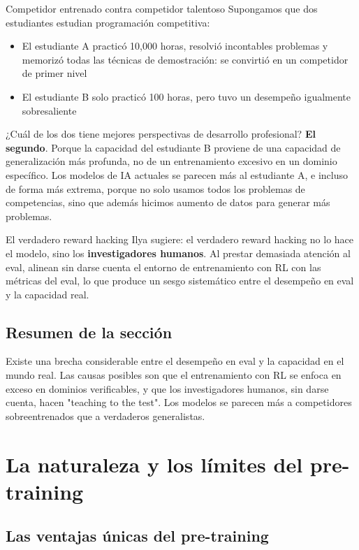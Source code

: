 \documentclass[a4paper]{article}
\begin{document}
\begin{importantbox}{Competidor entrenado contra competidor talentoso}
Supongamos que dos estudiantes estudian programación competitiva:
\begin{itemize}
    \item El estudiante A practicó 10,000 horas, resolvió incontables problemas y memorizó todas las técnicas de demostración: se convirtió en un competidor de primer nivel
    \item El estudiante B solo practicó 100 horas, pero tuvo un desempeño igualmente sobresaliente
\end{itemize}
¿Cuál de los dos tiene mejores perspectivas de desarrollo profesional? \textbf{El segundo}. Porque la capacidad del estudiante B proviene de una capacidad de generalización más profunda, no de un entrenamiento excesivo en un dominio específico. Los modelos de IA actuales se parecen más al estudiante A, e incluso de forma más extrema, porque no solo usamos todos los problemas de competencias, sino que además hicimos aumento de datos para generar más problemas.
\end{importantbox}

\begin{warningbox}{El verdadero reward hacking}
Ilya sugiere: el verdadero reward hacking no lo hace el modelo, sino los \textbf{investigadores humanos}. Al prestar demasiada atención al eval, alinean sin darse cuenta el entorno de entrenamiento con RL con las métricas del eval, lo que produce un sesgo sistemático entre el desempeño en eval y la capacidad real.
\end{warningbox}

\subsection{Resumen de la sección}

Existe una brecha considerable entre el desempeño en eval y la capacidad en el mundo real. Las causas posibles son que el entrenamiento con RL se enfoca en exceso en dominios verificables, y que los investigadores humanos, sin darse cuenta, hacen "teaching to the test". Los modelos se parecen más a competidores sobreentrenados que a verdaderos generalistas.
\section{La naturaleza y los límites del pre-training}

\subsection{Las ventajas únicas del pre-training}
\end{document}
